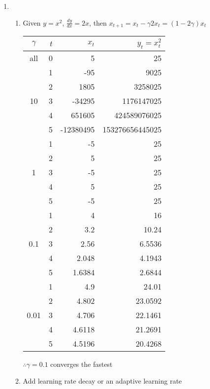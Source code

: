 \documentclass[12pt, a4paper]{article}
\begin{document}
\begin{enumerate}[\Alph*.]
  \pagebreak
  \item 
    \begin{enumerate}[\arabic*.]
      \item Given $y = x^2$, $\frac{dy}{dx} = 2x$, then $x_{t+1} = x_t - \gamma 2 x_t = (1-2\gamma)x_t$\\\vspace{1em}
        \begin{tabular}{c r r r}
        \hline
        $\gamma$ & $t$ & $x_t$ & $y_t=x_t^2$ \\
        \hline
        all   & 0 & 5         & 25 \\
        \hline
        & 1 & -95       & 9025 \\
        & 2 & 1805      & 3258025 \\
        10   & 3 & -34295    & 1176147025 \\
        & 4 & 651605    & 424589076025 \\
        & 5 & -12380495 & 153276656445025 \\
        \hline
        & 1 & -5  & 25 \\
        & 2 & 5   & 25 \\
        1    & 3 & -5  & 25 \\
        & 4 & 5   & 25 \\
        & 5 & -5  & 25 \\
        \hline
        & 1 & 4      & 16 \\
        & 2 & 3.2    & 10.24 \\
        0.1  & 3 & 2.56   & 6.5536 \\
        & 4 & 2.048  & 4.1943 \\
        & 5 & 1.6384 & 2.6844 \\
        \hline
         & 1 & 4.9    & 24.01 \\
         & 2 & 4.802  & 23.0592 \\
        0.01 & 3 & 4.706  & 22.1461 \\
         & 4 & 4.6118 & 21.2691 \\
         & 5 & 4.5196 & 20.4268 \\
        \hline
        \end{tabular}
        $\therefore \gamma = 0.1$ converges the fastest

      \item Add learning rate decay or an adaptive learning rate
    \end{enumerate}
\end{enumerate}
\end{document}
